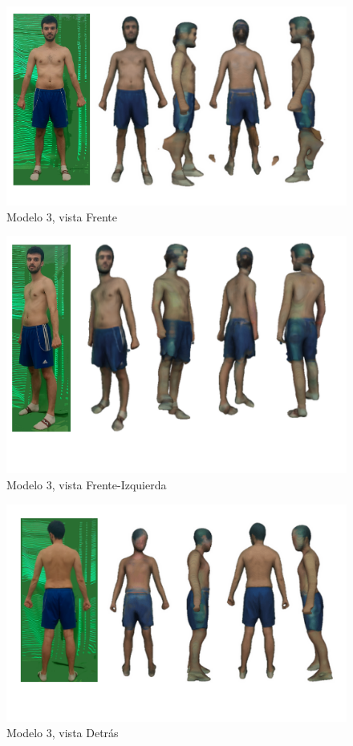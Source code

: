 \begin{figure}[H]
	\centering
	\includegraphics[scale=0.65]{imagenes/nahuel1.png}
	\caption{Modelo 3, vista Frente}
	\label{fig:n1}
\end{figure}
\begin{figure}[H]
	\centering
	\includegraphics[scale=0.65]{imagenes/nahuel2.png}
	\caption{Modelo 3, vista Frente-Izquierda}
	\label{fig:n2}
\end{figure}
\begin{figure}[H]
	\centering
	\includegraphics[scale=0.65]{imagenes/nahuel3.png}
	\caption{Modelo 3, vista Detrás}
	\label{fig:n3}
\end{figure}
